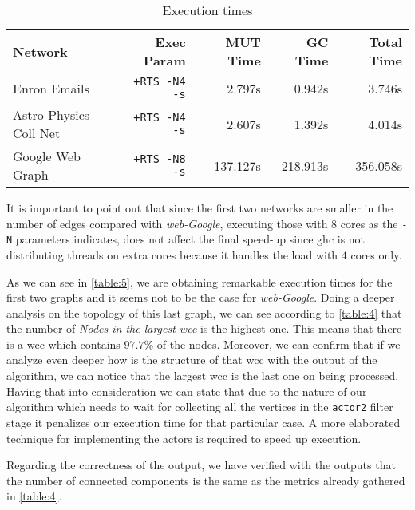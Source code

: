\begin{table}[H]
  \centering
  \begin{tabular}{|l|r|r|r|r|}
   \hline
   \textbf{Network} & \textbf{Exec Param} & \textbf{MUT Time} & \textbf{GC Time} & \textbf{Total Time}\\
   \hline
   Enron Emails & \texttt{+RTS -N4 -s} & 2.797s & 0.942s & 3.746s \\
   \hline
   Astro Physics Coll Net & \texttt{+RTS -N4 -s} & 2.607s & 1.392s & 4.014s \\
   \hline
   Google Web Graph & \texttt{+RTS -N8 -s} & 137.127s & 218.913s & 356.058s \\
   \hline
  \end{tabular}
 \caption{Execution times}
 \label{table:5}
 \end{table}

It is important to point out that since the first two networks are smaller in the number of edges compared with \emph{web-Google}, executing those with $8$ cores as the \texttt{-N} parameters indicates, does not affect the final speed-up since \acrshort{ghc} is not distributing threads on extra cores because it handles the load with $4$ cores only.

As we can see in \autoref{table:5}, we are obtaining remarkable execution times for the first two graphs and it seems not to be the case for \textit{web-Google}. Doing a deeper analysis on the topology of this last graph, we can see according to \autoref{table:4} that the number of \textit{Nodes in the largest \acrshort{wcc}} is the highest one. This means that there is a \acrshort{wcc} which contains $97.7\%$ of the nodes. Moreover, we can confirm that if we analyze even deeper how is the structure of that \acrshort{wcc} with the output of the algorithm, we can notice that the largest \acrshort{wcc} is the last one on being processed. Having that into consideration we can state that due to the nature of our algorithm which needs to wait for collecting all the vertices in the \texttt{actor2} filter stage 
it penalizes our execution time for that particular case. A more elaborated technique for implementing the actors is required to speed up execution. 

Regarding the correctness of the output, we have verified with the outputs that the number of connected components is the same as the metrics already gathered in \autoref{table:4}.

